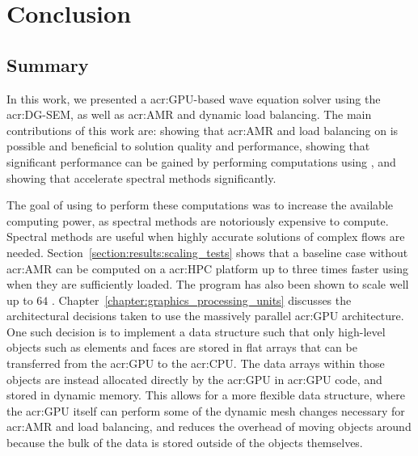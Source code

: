\chapter{Conclusion}\label{chapter:conclusion}

\section{Summary}\label{section:conclusion:summary}

In this work, we presented a \acrshort{acr:GPU}-based wave equation solver using the
\acrlong{acr:DG-SEM}, as well as \acrlong{acr:AMR} and dynamic load balancing. The main
contributions of this work are: showing that \acrshort{acr:AMR} and load balancing on
 is possible and beneficial to solution quality and performance, showing that
significant performance can be gained by performing computations using , and
showing that  accelerate spectral methods significantly.

The goal of using  to perform these computations was to increase the available
computing power, as spectral methods are notoriously expensive to compute. Spectral methods are
useful when highly accurate solutions of complex flows are needed.
Section~\ref{section:results:scaling_tests} shows that a baseline case without \acrshort{acr:AMR}
can be computed on a \acrshort{acr:HPC} platform up to three times faster using 
when they are sufficiently loaded. The program has also been shown to scale well up to \(64\)
. Chapter~\ref{chapter:graphics_processing_units} discusses the architectural
decisions taken to use the massively parallel \acrshort{acr:GPU} architecture. One such decision is
to implement a data structure such that only high-level objects such as elements and faces are
stored in flat arrays that can be transferred from the \acrshort{acr:GPU} to the \acrshort{acr:CPU}.
The data arrays within those objects are instead allocated directly by the \acrshort{acr:GPU} in
\acrshort{acr:GPU} code, and stored in dynamic memory. This allows for a more flexible data
structure, where the \acrshort{acr:GPU} itself can perform some of the dynamic mesh changes
necessary for \acrshort{acr:AMR} and load balancing, and reduces the overhead of moving objects
around because the bulk of the data is stored outside of the objects themselves.

